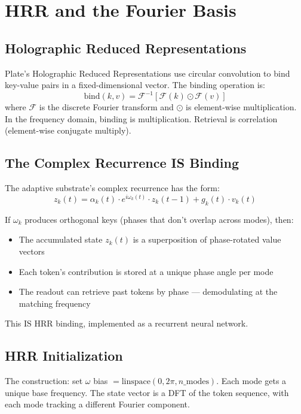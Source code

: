 \documentclass[11pt,a4paper]{report}
\begin{document}
\chapter{HRR and the Fourier Basis}
\label{ch:hrr}

\section{Holographic Reduced Representations}

Plate's Holographic Reduced Representations \cite{plate} use circular convolution to bind key-value pairs in a fixed-dimensional vector. The binding operation is:
\[
\text{bind}(k, v) = \mathcal{F}^{-1}[\mathcal{F}(k) \odot \mathcal{F}(v)]
\]
where $\mathcal{F}$ is the discrete Fourier transform and $\odot$ is element-wise multiplication. In the frequency domain, binding is multiplication. Retrieval is correlation (element-wise conjugate multiply).

\section{The Complex Recurrence IS Binding}

The adaptive substrate's complex recurrence has the form:
\[
z_k(t) = \alpha_k(t) \cdot e^{i\omega_k(t)} \cdot z_k(t-1) + g_k(t) \cdot v_k(t)
\]

If $\omega_k$ produces orthogonal keys (phases that don't overlap across modes), then:
\begin{itemize}[nosep]
\item The accumulated state $z_k(t)$ is a superposition of phase-rotated value vectors
\item Each token's contribution is stored at a unique phase angle per mode
\item The readout can retrieve past tokens by phase --- demodulating at the matching frequency
\end{itemize}

This IS HRR binding, implemented as a recurrent neural network.

\section{HRR Initialization}

The construction: set $\omega$ bias $= \text{linspace}(0, 2\pi, n\_\text{modes})$. Each mode gets a unique base frequency. The state vector is a DFT of the token sequence, with each mode tracking a different Fourier component.
\end{document}
